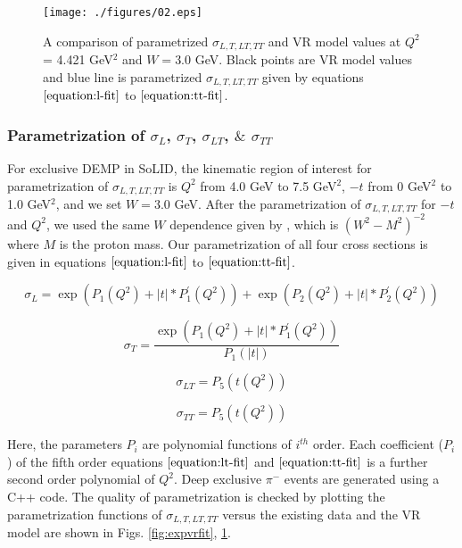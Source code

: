 \begin{figure}[!hbt]
    \centering
    \texttt{[image: ./figures/02.eps]}
    \caption{ A comparison of parametrized $\sigma_{L,T,LT,TT}$ and VR model
    values at $Q^2$ = 4.421 GeV$^2$ and $W = 3.0$ GeV.  Black points are VR
    model values and blue line is parametrized $\sigma_{L,T,LT,TT}$ given by
    equations $\ref{equation:l-fit}$ to $\ref{equation:tt-fit}$. }
    \label{fig:sigall}
\end{figure}

\subsubsection{Parametrization of $\sigma_{L}$, $\sigma_{T}$, $\sigma_{LT}$, 
$\&$ $\sigma_{TT}$
\label{sec:parametrization}}

For exclusive DEMP in SoLID, the kinematic region of interest for
parametrization of $\sigma_{L,T,LT,TT}$ is $Q^2$ from 4.0 GeV to 7.5 GeV$^2$,
$-t$ from 0 GeV$^2$ to 1.0 GeV$^2$, and we set $W=3.0$ GeV. After the
parametrization of $\sigma_{L,T,LT,TT}$ for $-t$ and $Q^2$, we used the same
$W$ dependence given by \cite{gmhuber}, which is $(W^2-M^2)^{-2}$ where $M$ is
the proton mass.  Our parametrization of all four cross sections is given in
equations $\ref{equation:l-fit}$ to $\ref{equation:tt-fit}$.

\begin{equation}
        \sigma_{L} = \exp{(P_1(Q^2) + |t| * P^{\prime}_1(Q^2))}
        + \exp{(P_2(Q^2) + |t| * P^{\prime}_2(Q^2))}
     \label{equation:l-fit}
\end{equation}

\begin{equation}
        \sigma_{T} = \frac{\exp{(P_1(Q^2) + |t| *
        P^{\prime}_1(Q^2))}}{P_{1}(|t|)}
     \label{equation:t-fit}
\end{equation}

\begin{equation}
        \sigma_{LT} = P_{5}(t(Q^2))
     \label{equation:lt-fit}
\end{equation}

\begin{equation}
        \sigma_{TT} = P_{5}(t(Q^2))       
     \label{equation:tt-fit}
\end{equation}

Here, the parameters $P_{i}$ are polynomial functions of $i^{th}$ order. Each
coefficient ($P_{i}$) of the fifth order equations $\ref{equation:lt-fit}$ and
$\ref{equation:tt-fit}$ is a further second order polynomial of $Q^2$. Deep
exclusive $\pi^{-}$ events are generated using a C++ code. The quality of
parametrization is checked by plotting the parametrization functions of
$\sigma_{L,T,LT,TT}$ versus the existing data and the VR model are shown in 
Figs. \ref{fig:expvrfit}, \ref{fig:sigall}.


